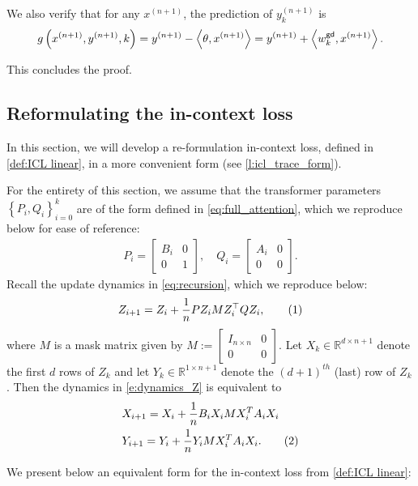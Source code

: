 \documentclass{article}
\newcommand{\R}{\mathbb{R}}
\renewcommand{\aa}{M}
\newcommand{\tx}[1]{x^{(#1)}}
\newcommand{\ty}[1]{y^{(#1)}}
\newcommand{\wgd}{w^{\sf gd}}
\newcommand*\lin[1]{\left\langle #1 \right\rangle}
\newcommand*\lrp[1]{\left( #1 \right)}
\newcommand*\lrbb[1]{\left\{ #1 \right\}}
\newcommand\numberthis{\addtocounter{equation}{1}\tag{\theequation}}
\begin{document}
We also verify that for any $\tx{n+1}$, the prediction of $\ty{n+1}_k$ is 
\begin{align*}
g\lrp{\tx{n+1}, \ty{n+1}, k} = \ty{n+1} -\lin{\theta, \tx{n+1}} = \ty{n+1} + \lin{\wgd_k, \tx{n+1}}.
\end{align*}

This concludes the proof.

 
\subsection{Reformulating the in-context loss}
In this section, we will develop a re-formulation in-context loss, defined in \eqref{def:ICL linear}, in a more convenient form (see \autoref{l:icl_trace_form}).

For the entirety of this section, we assume that the transformer parameters $\lrbb{P_i,Q_i}_{i=0}^k$ are of the form defined in \eqref{eq:full_attention}, which we reproduce below for ease of reference:
\begin{align}
P_i = \begin{bmatrix}
B_i & 0 \\ 
0 & 1
\end{bmatrix}, \quad Q_i = \begin{bmatrix}
A_i & 0 \\ 
0 & 0
\end{bmatrix}.
\end{align}
Recall the update dynamics in \eqref{eq:recursion}, which we reproduce below:
\begin{align*}
Z_{i+1} = Z_{i} + \frac{1}{n}  P Z_i \aa Z_i^\top Q Z_i,
\numberthis \label{e:dynamics_Z}
\end{align*}
where $M$ is a mask matrix given by $M := \begin{bmatrix}I_{n\times n} & 0 \\ 0 & 0\end{bmatrix}$. Let $X_k \in \R^{d\times n+1}$ denote the first $d$ rows of $Z_k$ and let $Y_k \in \R^{1\times n+1}$ denote the $(d+1)^{th}$ (last) row of $Z_k$. Then the dynamics in \eqref{e:dynamics_Z} is equivalent to
\begin{align*}
& X_{i+1} = X_i + \frac{1}{n} B_i X_i M X_i^T A_i X_i\\
& Y_{i+1} = Y_i + \frac{1}{n}Y_i M X_i^T A_i X_i.
\numberthis \label{e:dynamics_XY}
\end{align*}

We present below an equivalent form for the in-context loss from \eqref{def:ICL linear}:
\end{document}
